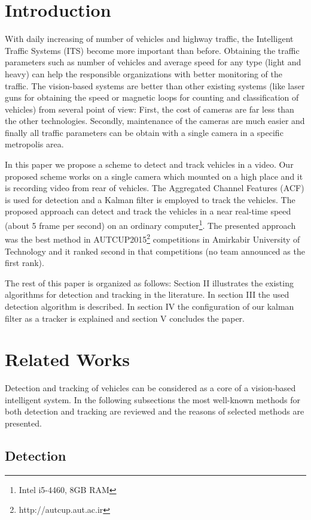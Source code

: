 \documentclass[conference]{IEEEtran}
\begin{document}
\section{Introduction}

With daily increasing of number of vehicles and highway traffic, the Intelligent Traffic Systems (ITS) become more important than before. Obtaining the traffic parameters such as number of vehicles and average speed for any type (light and heavy) can help the responsible organizations with better monitoring of the traffic. The vision-based systems are better than other existing systems (like laser guns for obtaining the speed or magnetic loops for counting and classification of vehicles) from several point of view: First, the cost of cameras are far less than the other technologies. Secondly, maintenance of the cameras are much easier and finally all traffic parameters can be obtain with a single camera in a specific metropolis area. 


In this paper we propose a scheme to detect and track vehicles in a video. Our proposed scheme works on a single camera which mounted on a high place and it is recording video from rear of vehicles. The Aggregated Channel Features (ACF) is used for detection and a Kalman filter is employed to track the vehicles. The proposed approach can detect and track the vehicles in a near real-time speed (about 5 frame per second) on an ordinary computer\footnote{Intel i5-4460, 8GB RAM}. The presented approach was the best method in AUTCUP2015\footnote{http://autcup.aut.ac.ir} competitions in Amirkabir University of Technology and it ranked second in that competitions (no team announced as the first rank).


The rest of this paper is organized as follows: Section II illustrates the existing algorithms for detection and tracking in the literature. In section III the used detection algorithm is described. In section IV the configuration of our kalman filter as a tracker is explained and section V concludes the paper. 
\section{Related Works}
Detection and tracking of vehicles can be considered as a core of a vision-based intelligent system. In the following subsections the most well-known methods for both detection and tracking are reviewed and the reasons of selected methods are presented.
\subsection{Detection}
\end{document}
